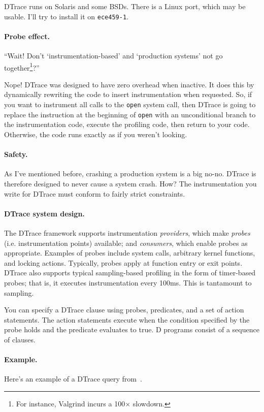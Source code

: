 DTrace runs on Solaris and some BSDs. There is a Linux port, which may be usable.
I'll try to install it on {\tt ece459-1}.

\paragraph{Probe effect.} ``Wait! Don't `instrumentation-based' 
and `production systems' not go together\footnote{For instance, Valgrind incurs a 100$\times$
slowdown.}?''

Nope! DTrace was designed to have zero overhead when inactive. It does
this by dynamically rewriting the code to insert instrumentation when
requested. So, if you want to instrument all calls to the {\tt open}
system call, then DTrace is going to replace the instruction at the
beginning of {\tt open} with an unconditional branch to the
instrumentation code, execute the profiling code, then return to your
code. Otherwise, the code runs exactly as if you weren't looking.

\paragraph{Safety.} As I've mentioned before, crashing a production
system is a big no-no. DTrace is therefore designed to never cause a
system crash. How? The instrumentation you write for DTrace 
must conform to fairly strict constraints.

\paragraph{DTrace system design.} The DTrace framework supports instrumentation
\emph{providers}, which make \emph{probes} (i.e.  instrumentation
points) available; and \emph{consumers}, which enable probes as
appropriate. Examples of probes include system calls, arbitrary kernel
functions, and locking actions. Typically, probes apply at function entry or exit points.
DTrace also supports typical
sampling-based profiling in the form of timer-based probes; that is,
it executes instrumentation every 100ms. This is tantamount to
sampling.

You can specify a DTrace clause using probes, predicates, and a set of
action statements. The action statements execute when the condition
specified by the probe holds and the predicate evaluates to true. D
programs consist of a sequence of clauses.

\paragraph{Example.} Here's an example of a DTrace query from~\cite{Cantrill:2004:DIP:1247415.1247417}.

